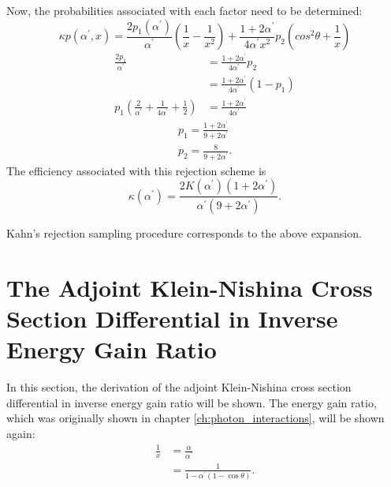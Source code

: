 Now, the probabilities associated with each factor need to be determined:
\begin{equation*}
  \kappa p(\alpha^{'},x) = \frac{2 p_1(\alpha^{'})}{\alpha^{'}}
  \left(\frac{1}{x} - \frac{1}{x^2}\right) + 
  \frac{1+2\alpha^{'}}{4\alpha^{'}x^2}p_2 \left(cos^2\theta + \frac{1}{x}\right)
\end{equation*}
\begin{align}
  \frac{2p_1}{\alpha^{'}} & = \frac{1+2\alpha^{'}}{4\alpha^{'}}p_2 \nonumber \\
  & = \frac{1+2\alpha^{'}}{4\alpha^{'}}(1-p_1) \nonumber \\
  p_1\left(\frac{2}{\alpha^{'}} + \frac{1}{4\alpha^{'}} + \frac{1}{2} \right)
  & = \frac{1+2\alpha^{'}}{4\alpha^{'}} \nonumber
\end{align}
\begin{align}
  p_1 = \frac{1+2\alpha^{'}}{9 + 2\alpha^{'}} \\
  p_2 = \frac{8}{9 + 2\alpha^{'}}.
\end{align}
The efficiency associated with this rejection scheme is
\begin{equation}
  \kappa(\alpha^{'}) = \frac{2 K(\alpha^{'})(1+2\alpha^{'})}
  {\alpha^{'}(9+2\alpha^{'})}.
\end{equation}

Kahn's rejection sampling procedure corresponds to the above expansion.
  
\section{The Adjoint Klein-Nishina Cross Section Differential in Inverse Energy Gain Ratio}
In this section, the derivation of the adjoint Klein-Nishina cross section
differential in inverse energy gain ratio will be shown. The energy gain
ratio, which was originally shown in chapter \ref{ch:photon_interactions}, 
will be shown again:
\begin{align}
  \frac{1}{x} & = \frac{\alpha}{\alpha^{'}} \nonumber \\
  & = \frac{1}{1 - \alpha^{'}(1-\cos{\theta})}. \nonumber
\end{align}

